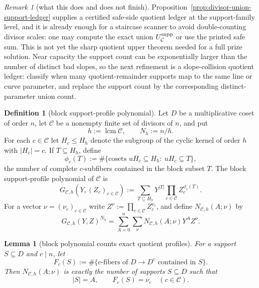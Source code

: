 \documentclass[11pt]{article}
\newtheorem{lemma}[lemma]{Lemma}
\theoremstyle{definition}
\newtheorem{definition}[definition]{Definition}
\theoremstyle{remark}
\newtheorem{remark}[remark]{Remark}
\begin{document}
\begin{remark}[what this does and does not finish]
\label{rem:quotient-upper-status}
Proposition~\ref{prop:divisor-union-support-ledger} supplies a certified
safe-side quotient ledger at the support-family level, and it is already enough
for a staircase scanner to avoid double-counting divisor scales: one may compute
the exact union $U_{\mathcal C}^{\rm supp}$ or use the printed safe sum.  This is
not yet the sharp quotient upper theorem needed for a full prize solution.  Near
capacity the support count can be exponentially larger than the number of
distinct bad slopes, so the next refinement is a slope-collision quotient ledger:
classify when many quotient-remainder supports map to the same line or curve
parameter, and replace the support count by the corresponding distinct-parameter
union count.
\end{remark}


\begin{definition}[block support-profile polynomial]
\label{def:block-support-profile-polynomial}
Let $D$ be a multiplicative coset of order $n$, let
$\mathcal C$ be a nonempty finite set of divisors of $n$, and put
\[
        h:=\operatorname{lcm}\mathcal C,
        \qquad N_h:=n/h .
\]
For each $c\in\mathcal C$ let $H_c\le H_h$ denote the subgroup of the cyclic
kernel of order $h$ with $|H_c|=c$.  If $T\subseteq H_h$, define
\[
        \phi_c(T):=\#\{\text{cosets }uH_c\subseteq H_h:\ uH_c\subseteq T\},
\]
the number of complete $c$-subfibers contained in the block subset $T$.
The block support-profile polynomial of $\mathcal C$ is
\[
        G_{\mathcal C,h}(Y,(Z_c)_{c\in\mathcal C})
        :=\sum_{T\subseteq H_h}
          Y^{|T|}\prod_{c\in\mathcal C}Z_c^{\phi_c(T)} .
\]
For a vector $\nu=(\nu_c)_{c\in\mathcal C}$ write
$Z^\nu:=\prod_{c\in\mathcal C}Z_c^{\nu_c}$, and define
$N_{\mathcal C,h}(A;\nu)$ by
\[
        G_{\mathcal C,h}(Y,Z)^{N_h}
        =\sum_{A=0}^{n}\sum_{\nu}
          N_{\mathcal C,h}(A;\nu)Y^A Z^\nu .
\]
\end{definition}

\begin{lemma}[block polynomial counts exact quotient profiles]
\label{lem:block-polynomial-counts-profiles}
For a support $S\subseteq D$ and $c\mid n$, let
\[
        F_c(S):=\#\{\text{$c$-fibers of }D\to D^c\text{ contained in }S\}.
\]
Then $N_{\mathcal C,h}(A;\nu)$ is exactly the number of supports
$S\subseteq D$ such that
\[
        |S|=A,
        \qquad F_c(S)=\nu_c\quad(c\in\mathcal C).
\]
\end{lemma}
\end{document}
